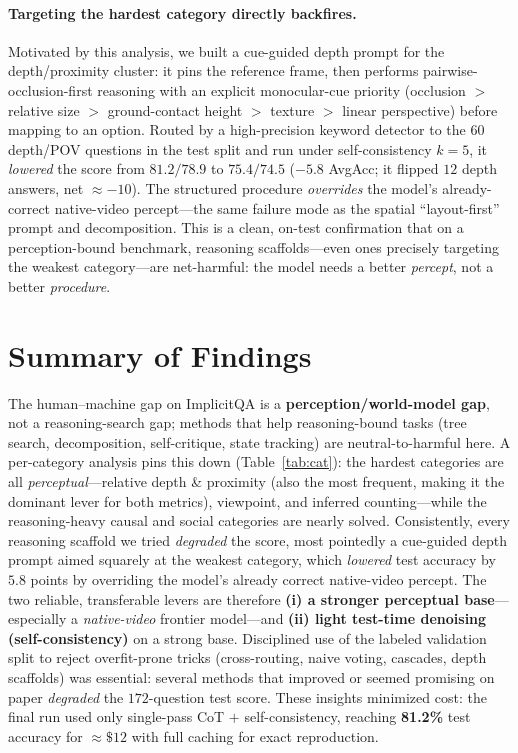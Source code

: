 \documentclass[10pt,twocolumn,letterpaper]{article}
\newcommand{\best}[1]{\textbf{#1}}
\begin{document}
\paragraph{Targeting the hardest category directly backfires.} Motivated by this analysis, we built a
cue-guided depth prompt for the depth/proximity cluster: it pins the reference frame, then performs
pairwise-occlusion-first reasoning with an explicit monocular-cue priority (occlusion $>$ relative size
$>$ ground-contact height $>$ texture $>$ linear perspective) before mapping to an option. Routed by a
high-precision keyword detector to the $60$ depth/POV questions in the test split and run under
self-consistency $k{=}5$, it \emph{lowered} the score from $81.2/78.9$ to $75.4/74.5$ ($-5.8$ AvgAcc;
it flipped $12$ depth answers, net ${\approx}-10$). The structured procedure \emph{overrides} the model's
already-correct native-video percept---the same failure mode as the spatial ``layout-first'' prompt and
decomposition. This is a clean, on-test confirmation that on a perception-bound benchmark, reasoning
scaffolds---even ones precisely targeting the weakest category---are net-harmful: the model needs a
better \emph{percept}, not a better \emph{procedure}.

\section{Summary of Findings}
The human--machine gap on ImplicitQA is a \textbf{perception/world-model gap}, not a reasoning-search
gap; methods that help reasoning-bound tasks (tree search, decomposition, self-critique, state
tracking) are neutral-to-harmful here. A per-category analysis pins this down (Table~\ref{tab:cat}):
the hardest categories are all \emph{perceptual}---relative depth \& proximity (also the most frequent,
making it the dominant lever for both metrics), viewpoint, and inferred counting---while the
reasoning-heavy causal and social categories are nearly solved. Consistently, every reasoning scaffold
we tried \emph{degraded} the score, most pointedly a cue-guided depth prompt aimed squarely at the
weakest category, which \emph{lowered} test accuracy by $5.8$ points by overriding the model's already
correct native-video percept. The two reliable, transferable levers are therefore \textbf{(i) a
stronger perceptual base}---especially a \emph{native-video} frontier model---and \textbf{(ii) light
test-time denoising (self-consistency)} on a strong base. Disciplined use of the labeled validation
split to reject overfit-prone tricks (cross-routing, naive voting, cascades, depth scaffolds) was
essential: several methods that improved or seemed promising on paper \emph{degraded} the
$172$-question test score. These insights minimized cost: the final run used only single-pass CoT $+$
self-consistency, reaching \best{81.2\%} test accuracy for ${\approx}\$12$ with full caching for exact
reproduction.
\end{document}
